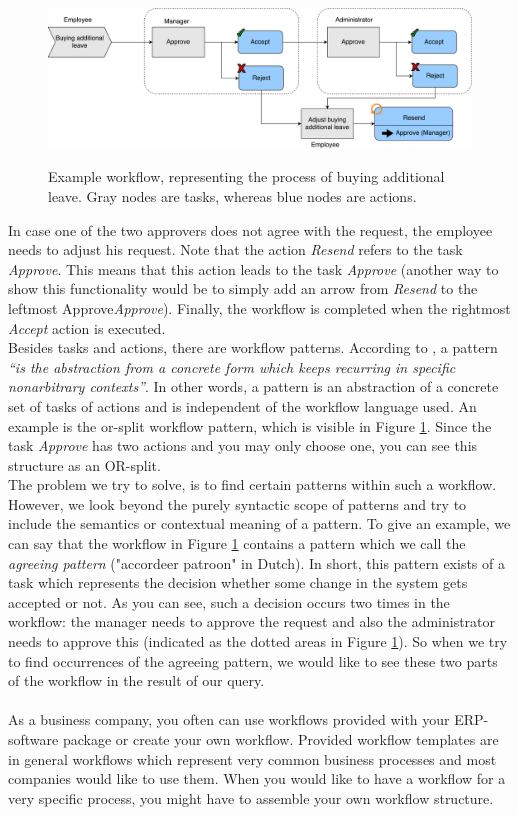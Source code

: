 \documentclass[a4paper,11pt]{article}
\begin{document}
\begin{figure}[H]
\centering
\includegraphics[width=\linewidth]{Example_Workflow.pdf}
\label{figure:example_workflow}
\caption{Example workflow, representing the process of buying additional leave. Gray nodes are tasks, whereas blue nodes are actions. }
\end{figure}

In case one of the two approvers does not agree with the request, the employee needs to adjust his request. Note that the action \textit{Resend} refers to the task \textit{Approve}. This means that this action leads to the task \textit{Approve} (another way to show this functionality would be to simply add an arrow from \textit{Resend} to the leftmost Approve\textit{Approve}). Finally, the workflow is completed when the rightmost \textit{Accept} action is executed.\\
Besides tasks and actions, there are workflow patterns. According to \cite{Riehle1996}, a pattern \textit{“is the abstraction from a concrete form which keeps recurring in specific nonarbitrary contexts”}. In other words, a pattern is an abstraction of a concrete set of tasks of actions and is independent of the workflow language used. An example is the or-split workflow pattern, which is visible in Figure \ref{figure:example_workflow}. Since the task \textit{Approve} has two actions and you may only choose one, you can see this structure as an OR-split.\\
The problem we try to solve, is to find certain patterns within such a workflow. However, we look beyond the purely syntactic scope of patterns and try to include the semantics or contextual meaning of a pattern. To give an example, we can say that the workflow in Figure \ref{figure:example_workflow} contains a pattern which we call the \textit{agreeing pattern} ("accordeer patroon" in Dutch). In short, this pattern exists of a task which represents the decision whether some change in the system gets accepted or not. As you can see, such a decision occurs two times in the workflow: the manager needs to approve the request and also the administrator needs to approve this (indicated as the dotted areas in Figure \ref{figure:example_workflow}). So when we try to find occurrences of the agreeing pattern, we would like to see these two parts of the workflow in the result of our query.
\\
\\
As a business company, you often can use workflows provided with your ERP-software package or create your own workflow. Provided workflow templates are in general workflows which represent very common business processes and most companies would like to use them. When you would like to have a workflow for a very specific process, you might have to assemble your own workflow structure.
\end{document}

